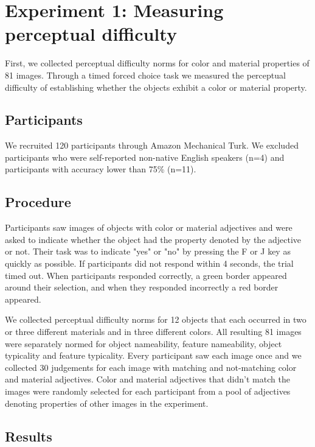 \documentclass[12pt,letterpaper]{article}
\begin{document}
\section{Experiment 1: Measuring perceptual difficulty} 

First, we collected perceptual difficulty norms for color and material properties of 81 images. Through a timed forced choice task we measured the perceptual difficulty of establishing whether the objects exhibit a color or material property.

\subsection{Participants} 

We recruited 120 participants through Amazon Mechanical Turk. We excluded participants who were self-reported non-native English speakers (n=4) and participants with accuracy lower than 75\% (n=11).

\subsection{Procedure} 

Participants saw images of objects with color or material adjectives and were asked to indicate whether the object had the property denoted by the adjective or not. Their task was to indicate "yes" or "no" by pressing the F or J key as quickly as possible. If participants did not respond within 4 seconds, the trial timed out. When participants responded correctly, a green border appeared around their selection, and when they responded incorrectly a red border appeared.

We collected perceptual difficulty norms for 12 objects that each occurred in two or three different materials and in three different colors. All resulting 81 images were separately normed for object nameability, feature nameability, object typicality and feature typicality. Every participant saw each image once and we collected 30 judgements for each image with matching and not-matching color and material adjectives. Color and material adjectives that didn't match the images were randomly selected for each participant from a pool of adjectives denoting properties of other images in the experiment.

\subsection{Results} 
\end{document}
